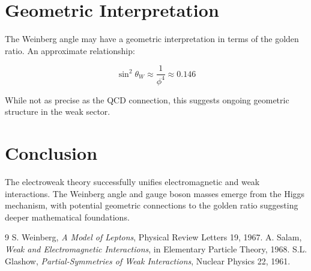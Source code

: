 \section{Geometric Interpretation}

The Weinberg angle may have a geometric interpretation in terms of the golden ratio. An approximate relationship:

\begin{equation}
\sin^2\theta_W \approx \frac{1}{\phi^4} \approx 0.146
\end{equation}

While not as precise as the QCD connection, this suggests ongoing geometric structure in the weak sector.

\section{Conclusion}

The electroweak theory successfully unifies electromagnetic and weak interactions. The Weinberg angle and gauge boson masses emerge from the Higgs mechanism, with potential geometric connections to the golden ratio suggesting deeper mathematical foundations.


\begin{thebibliography}{9}
 S. Weinberg, \textit{A Model of Leptons}, Physical Review Letters 19, 1967.
 A. Salam, \textit{Weak and Electromagnetic Interactions}, in Elementary Particle Theory, 1968.
 S.L. Glashow, \textit{Partial-Symmetries of Weak Interactions}, Nuclear Physics 22, 1961.
\end{thebibliography}
